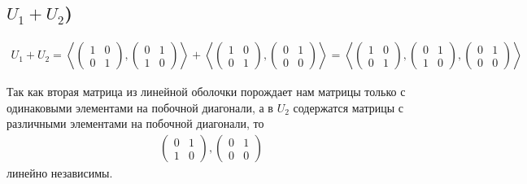\subsection{$U_1 + U_2$)}
\begin{gather}
    U_1 + U_2 =
    \left<
        \begin{pmatrix}
            1 & 0 \\
            0 & 1
        \end{pmatrix},
        \begin{pmatrix}
            0 & 1 \\
            1 & 0
        \end{pmatrix}
    \right> + 
    \left<
        \begin{pmatrix}
            1 & 0 \\
            0 & 1
        \end{pmatrix},
        \begin{pmatrix}
            0 & 1 \\
            0 & 0
        \end{pmatrix}
    \right> = 
    \left<
        \begin{pmatrix}
            1 & 0 \\
            0 & 1
        \end{pmatrix},
        \begin{pmatrix}
            0 & 1 \\
            1 & 0
        \end{pmatrix},
        \begin{pmatrix}
            0 & 1 \\
            0 & 0
        \end{pmatrix}
    \right>
\end{gather}
\begin{remark}
    Так как вторая матрица из линейной оболочки порождает нам матрицы только с одинаковыми элементами на побочной диагонали, а в $U_2$ содержатся матрицы с различными элементами на побочной диагонали, то
    \begin{gather}
        \begin{pmatrix}
            0 & 1 \\
            1 & 0
        \end{pmatrix},
        \begin{pmatrix}
            0 & 1 \\
            0 & 0
        \end{pmatrix}
    \end{gather}
    линейно независимы.
\end{remark}

